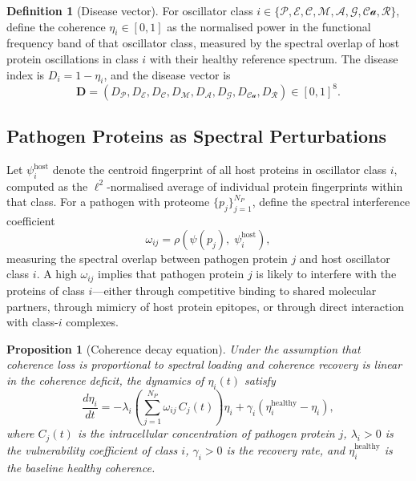 \documentclass[twocolumn,11pt,a4paper]{article}
\newtheorem{proposition}[theorem]{Proposition}
\theoremstyle{definition}
\newtheorem{definition}[theorem]{Definition}
\theoremstyle{remark}
\begin{document}
\begin{definition}[Disease vector]
\label{def:disease_vector}
For oscillator class
$i \in \{\mathcal{P}, \mathcal{E}, \mathcal{C}, \mathcal{M}, \mathcal{A},
\mathcal{G}, \mathcal{Ca}, \mathcal{R}\}$, define the coherence
$\eta_i \in [0, 1]$ as the normalised power in the functional frequency band
of that oscillator class, measured by the spectral overlap of host protein
oscillations in class $i$ with their healthy reference spectrum. The disease
index is $D_i = 1 - \eta_i$, and the disease vector is
\begin{equation}
  \mathbf{D} = (D_\mathcal{P}, D_\mathcal{E}, D_\mathcal{C}, D_\mathcal{M},
    D_\mathcal{A}, D_\mathcal{G}, D_{\mathcal{Ca}}, D_\mathcal{R}) \in [0,1]^8.
  \label{eq:disease_vector}
\end{equation}
\end{definition}

\subsection{Pathogen Proteins as Spectral Perturbations}

Let $\psi_i^{\text{host}}$ denote the centroid fingerprint of all host proteins
in oscillator class $i$, computed as the $\ell^2$-normalised average of
individual protein fingerprints within that class. For a pathogen with proteome
$\{p_j\}_{j=1}^{N_P}$, define the spectral interference coefficient
\begin{equation}
  \omega_{ij} = \rho\!\left(\psi(p_j),\; \psi_i^{\text{host}}\right),
  \label{eq:omega}
\end{equation}
measuring the spectral overlap between pathogen protein $j$ and host oscillator
class $i$. A high $\omega_{ij}$ implies that pathogen protein $j$ is likely to
interfere with the proteins of class $i$---either through competitive binding to
shared molecular partners, through mimicry of host protein epitopes, or through
direct interaction with class-$i$ complexes.

\begin{proposition}[Coherence decay equation]
\label{prop:coherence_decay}
Under the assumption that coherence loss is proportional to spectral loading
and coherence recovery is linear in the coherence deficit, the dynamics of
$\eta_i(t)$ satisfy
\begin{equation}
  \frac{d\eta_i}{dt} = -\lambda_i \!\left(\sum_{j=1}^{N_P} \omega_{ij}\, C_j(t)\right) \eta_i
    + \gamma_i \!\left(\eta_i^{\text{healthy}} - \eta_i\right),
  \label{eq:coherence_decay}
\end{equation}
where $C_j(t)$ is the intracellular concentration of pathogen protein $j$,
$\lambda_i > 0$ is the vulnerability coefficient of class $i$, $\gamma_i > 0$
is the recovery rate, and $\eta_i^{\text{healthy}}$ is the baseline healthy
coherence.
\end{proposition}
\end{document}
